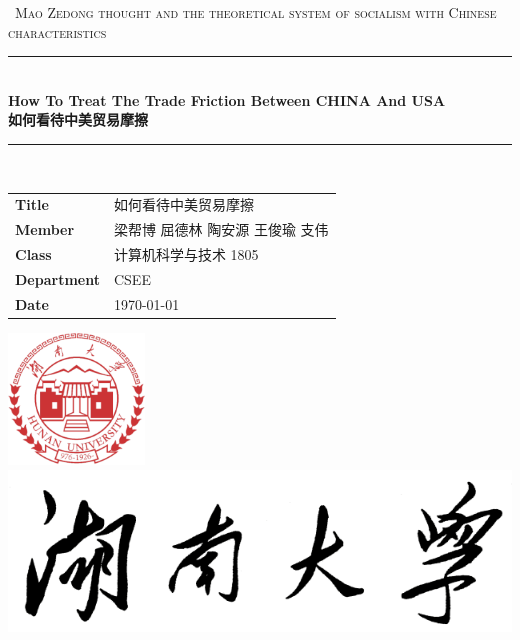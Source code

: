 \documentclass{hnureport}
\begin{document}
\begin{titlepage}
    \clearpage\thispagestyle{empty}
    \centering
    \vspace{1cm}
    {\
        \textsc{Mao Zedong thought and the theoretical system of socialism with Chinese characteristics}
    }
    \vspace{2.5cm}
    
    \rule{\linewidth}{2mm} \\[0.5cm]
    { \Huge \bfseries How To Treat The Trade Friction Between CHINA And USA\\[0.5cm]
        如何看待中美贸易摩擦}\\[0.5cm]
    \rule{\linewidth}{0.6mm} \\[1.5cm]
    
    \hspace{2cm}
    \begin{tabular}{l p{5cm}}
        \textbf{Title} & 如何看待中美贸易摩擦 \\[10pt]
        \textbf{Member} & 梁帮博 \quad 屈德林 \quad 陶安源 \quad 王俊瑜 \quad 支伟 \\[10pt]
        \textbf{Class} & 计算机科学与技术 1805 \\[10pt]
        \textbf{Department} & CSEE \\[10pt]
        \textbf{Date} & \today \\            
    \end{tabular}
    
    \vfill
    \centering \includegraphics[height=3.5cm]{Figure/HNUlogo.pdf}\\ %
    \centering \includegraphics[scale=0.3]{Figure/logo_slogan.png}
    \vspace{0.5cm}

    \pagebreak
\end{titlepage}


\thispagestyle{empty}
\tableofcontents
\newpage 
\setcounter{page}{1}







\appendix


\end{document}
